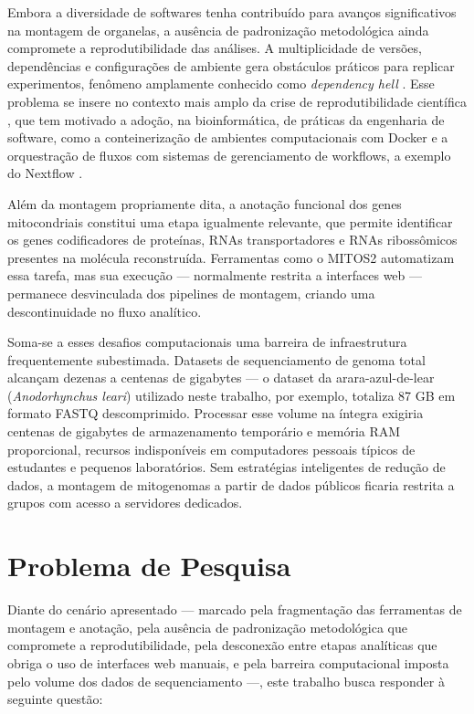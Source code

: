 Embora a diversidade de softwares tenha contribuído para avanços significativos na montagem de organelas, a ausência de padronização metodológica ainda compromete a reprodutibilidade das análises. A multiplicidade de versões, dependências e configurações de ambiente gera obstáculos práticos para replicar experimentos, fenômeno amplamente conhecido como \textit{dependency hell} \cite{gruning2018}. Esse problema se insere no contexto mais amplo da crise de reprodutibilidade científica \cite{baker2016}, que tem motivado a adoção, na bioinformática, de práticas da engenharia de software, como a conteinerização de ambientes computacionais com Docker \cite{merkel2014} e a orquestração de fluxos com sistemas de gerenciamento de workflows, a exemplo do Nextflow \cite{ditommaso2017}.

Além da montagem propriamente dita, a anotação funcional dos genes mitocondriais constitui uma etapa igualmente relevante, que permite identificar os genes codificadores de proteínas, RNAs transportadores e RNAs ribossômicos presentes na molécula reconstruída. Ferramentas como o MITOS2 \cite{donath2019} automatizam essa tarefa, mas sua execução --- normalmente restrita a interfaces web --- permanece desvinculada dos pipelines de montagem, criando uma descontinuidade no fluxo analítico.

Soma-se a esses desafios computacionais uma barreira de infraestrutura frequentemente subestimada. Datasets de sequenciamento de genoma total alcançam dezenas a centenas de gigabytes --- o dataset da arara-azul-de-lear (\textit{Anodorhynchus leari}) utilizado neste trabalho, por exemplo, totaliza 87 GB em formato FASTQ descomprimido. Processar esse volume na íntegra exigiria centenas de gigabytes de armazenamento temporário e memória RAM proporcional, recursos indisponíveis em computadores pessoais típicos de estudantes e pequenos laboratórios. Sem estratégias inteligentes de redução de dados, a montagem de mitogenomas a partir de dados públicos ficaria restrita a grupos com acesso a servidores dedicados.

\section{Problema de Pesquisa}

Diante do cenário apresentado --- marcado pela fragmentação das ferramentas de montagem e anotação, pela ausência de padronização metodológica que compromete a reprodutibilidade, pela desconexão entre etapas analíticas que obriga o uso de interfaces web manuais, e pela barreira computacional imposta pelo volume dos dados de sequenciamento ---, este trabalho busca responder à seguinte questão:

